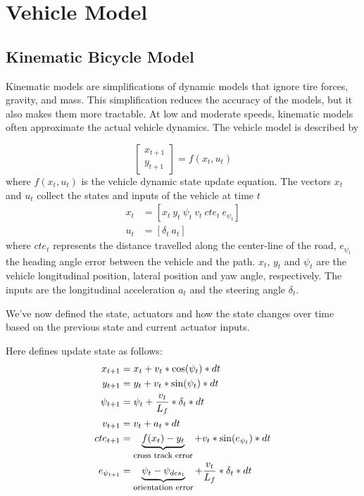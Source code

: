 \section{Vehicle Model}

\subsection{Kinematic Bicycle Model}
Kinematic models are simplifications of dynamic models that ignore tire forces, gravity, and mass.
This simplification reduces the accuracy of the models, but it also makes them more tractable.
At low and moderate speeds, kinematic models often approximate the actual vehicle dynamics.
The vehicle model is described by

\begin{equation}\label{eq:VehicleModel}
\begin{bmatrix}
x_{t+1}\\
y_{t+1}
\end{bmatrix} = f(x_t, u_t)
\end{equation}
where $f(x_t, u_t)$ is the vehicle dynamic state update equation. The vectors $x_t$ and $u_t$ collect the states and inputs of the vehicle at time $t$
\begin{subequations}\label{eq:StateInputVector}
\begin{align}
x_t &= [x_t ~ y_t ~\psi_t ~ v_t ~ cte_t ~ e_{\psi_t} ]\\
u_t &= [\delta_t ~ a_t ]
\end{align}
\end{subequations}
where $cte_t$ represents the distance travelled along the center-line of the road, $e_{\psi_t}$ the heading angle error between the vehicle and the path. $x_t$, $y_t$ and ${\psi}_{t}$ are the vehicle longitudinal position, lateral position and yaw angle, respectively. The inputs are the longitudinal acceleration $a_t$ and the steering angle $\delta_t$.

We've now defined the state, actuators and how the state changes over time based on the previous state and current actuator inputs.

Here defines update state as  follows:
\begin{subequations}\label{eq:StateUpdate}
\begin{align}
x_{t+1} &= x_t + v_t * \cos({\psi}_t) * dt\\
y_{t+1} &= y_t + v_t * \sin({\psi}_t) * dt\\
\psi_{t+1} &= \psi_t + \frac{v_t}{L_f} * \delta_t * dt\\
v_{t+1} &= v_t + a_t * dt\\
cte_{t+1} &= \underbrace{f(x_t) - y_t}_{\mbox{\footnotesize{cross track error}}} + v_t * \sin(e_{\psi_t}) * dt\\
e_{\psi_{t+1}} &= \underbrace{\psi_t - {\psi}_{des_t}}_{\mbox{\footnotesize{orientation error}}} + \frac{v_t}{L_f} * \delta_t * dt
\end{align}
\end{subequations}

